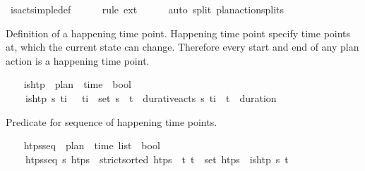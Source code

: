 \begin{isabellebody}
%
\isatagproof
{}\isamarkupfalse%
\ is{\isacharunderscore}{\kern0pt}act{\isacharunderscore}{\kern0pt}simple{\isacharunderscore}{\kern0pt}def\isanewline
\ \ \ \ \isamarkupfalse%
\ {\isacharparenleft}{\kern0pt}rule\ ext{\isacharparenright}{\kern0pt}\isanewline
\ \ \ \ \isamarkupfalse%
\ {\isacharparenleft}{\kern0pt}auto\ split{\isacharcolon}{\kern0pt}\ plan{\isacharunderscore}{\kern0pt}action{\isachardot}{\kern0pt}splits{\isacharparenright}{\kern0pt}%
\endisatagproof
{\isafoldproof}%
%
\isadelimproof
%
\endisadelimproof
%
\begin{isamarkuptext}%
Definition of a happening time point. Happening time point specify time points at, 
  which the current state can change. Therefore every start and end of any plan action is 
  a happening time point.%
\end{isamarkuptext}\isamarkuptrue%
\ \ \isamarkupfalse%
\ is{\isacharunderscore}{\kern0pt}htp\ {\isacharcolon}{\kern0pt}{\isacharcolon}{\kern0pt}\ {\isachardoublequoteopen}plan\ {\isasymRightarrow}\ time\ {\isasymRightarrow}\ bool{\isachardoublequoteclose}\ \isanewline
\ \ \ \ {\isachardoublequoteopen}is{\isacharunderscore}{\kern0pt}htp\ {\isasympi}s\ t\isactrlsub i\ {\isasymlongleftrightarrow}\ {\isacharparenleft}{\kern0pt}{\isasymexists}{\isasympi}{\isachardot}{\kern0pt}\ {\isacharparenleft}{\kern0pt}t\isactrlsub i{\isacharcomma}{\kern0pt}{\isasympi}{\isacharparenright}{\kern0pt}\ {\isasymin}\ set\ {\isasympi}s{\isacharparenright}{\kern0pt}\ {\isasymor}\ {\isacharparenleft}{\kern0pt}{\isasymexists}{\isacharparenleft}{\kern0pt}t\isactrlsub {\isasympi}{\isacharcomma}{\kern0pt}{\isasympi}{\isacharparenright}{\kern0pt}\ {\isasymin}\ durative{\isacharunderscore}{\kern0pt}acts\ {\isasympi}s{\isachardot}{\kern0pt}\ t\isactrlsub i\ {\isacharequal}{\kern0pt}\ t\isactrlsub {\isasympi}\ {\isacharplus}{\kern0pt}\ {\isacharparenleft}{\kern0pt}duration\ {\isasympi}{\isacharparenright}{\kern0pt}{\isacharparenright}{\kern0pt}{\isachardoublequoteclose}%
\begin{isamarkuptext}%
Predicate for sequence of happening time points.%
\end{isamarkuptext}\isamarkuptrue%
\ \ \isamarkupfalse%
\ htps{\isacharunderscore}{\kern0pt}seq\ {\isacharcolon}{\kern0pt}{\isacharcolon}{\kern0pt}\ {\isachardoublequoteopen}plan\ {\isasymRightarrow}\ time\ list\ {\isasymRightarrow}\ bool{\isachardoublequoteclose}\ \isanewline
\ \ \ \ {\isachardoublequoteopen}htps{\isacharunderscore}{\kern0pt}seq\ {\isasympi}s\ htps\ {\isasymlongleftrightarrow}\ strict{\isacharunderscore}{\kern0pt}sorted\ htps\ {\isasymand}\ {\isacharparenleft}{\kern0pt}{\isasymforall}t{\isachardot}{\kern0pt}\ t\ {\isasymin}\ set\ htps\ {\isasymlongleftrightarrow}\ is{\isacharunderscore}{\kern0pt}htp\ {\isasympi}s\ t{\isacharparenright}{\kern0pt}{\isachardoublequoteclose}%

\end{isabellebody}
